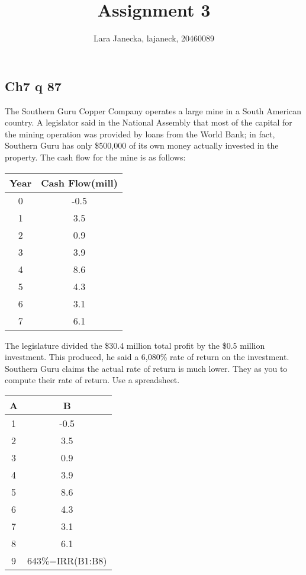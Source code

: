 \documentclass[12pt]{article}
\begin{document}
\title{Assignment 3}
\author{Lara Janecka, lajaneck, 20460089}
\maketitle

\subsection*{Ch7 q 87}
The Southern Guru Copper Company operates a large mine in a South American country. A legislator said in the National Assembly that most of the capital for the mining operation was provided by loans from the World Bank; in fact, Southern Guru has only \$500,000 of its own money actually invested in the property. The cash flow for the mine is as follows:
\begin{center}
    \begin{tabular}{c c}
    \textbf{Year} & \textbf{Cash Flow}(mill)\\
    \hline
    0 & -0.5\\
    1 & 3.5\\
    2 & 0.9\\
    3 & 3.9\\
    4 & 8.6\\
    5 & 4.3\\
    6 & 3.1\\
    7 & 6.1\\
    \end{tabular}
\end{center}

The legislature divided the \$30.4 million total profit by the \$0.5 million investment. This produced, he said a 6,080\% rate of return on the investment. Southern Guru claims the actual rate of return is much lower. They as you to compute their rate of return. Use a spreadsheet.

\begin{center}
    \begin{tabular}{|c|c|}
    \hline
    A & B\\
    \hline
    1 & -0.5\\
    \hline
    2 & 3.5\\
    \hline
    3 & 0.9\\
    \hline
    4 & 3.9\\
    \hline
    5 & 8.6\\
    \hline
    6 & 4.3\\
    \hline
    7 & 3.1\\
    \hline
    8 & 6.1\\
    \hline
    9 & 643\%=IRR(B1:B8)\\
    \hline
    \end{tabular}
\end{center}
\end{document}
